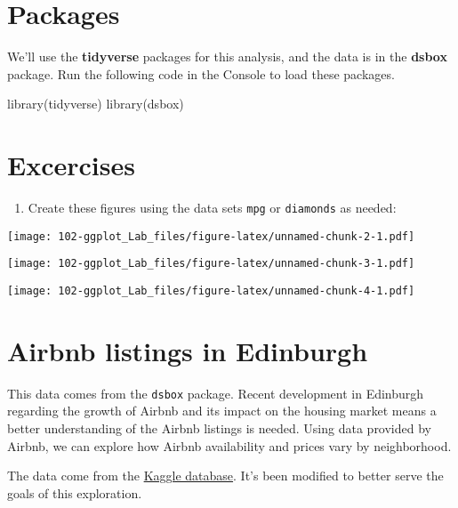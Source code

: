 \documentclass[
]{book}
\newenvironment{Shaded}{\begin{snugshade}}{\end{snugshade}}
\newcommand{\FunctionTok}[1]{\textcolor[rgb]{0.00,0.00,0.00}{#1}}
\newcommand{\NormalTok}[1]{#1}
\providecommand{\tightlist}{%
  \setlength{\itemsep}{0pt}\setlength{\parskip}{0pt}}
\begin{document}
\hypertarget{packages}{%
\section{Packages}\label{packages}}

We'll use the \textbf{tidyverse} packages for this analysis, and the data is in the \textbf{dsbox} package. Run the following code in the Console to load these packages.

\begin{Shaded}
\begin{Highlighting}[]
\FunctionTok{library}\NormalTok{(tidyverse)}
\FunctionTok{library}\NormalTok{(dsbox)}
\end{Highlighting}
\end{Shaded}

\hypertarget{excercises}{%
\section{Excercises}\label{excercises}}

\begin{enumerate}
\def\labelenumi{\arabic{enumi}.}
\tightlist
\item
  Create these figures using the data sets \texttt{mpg} or \texttt{diamonds} as needed:
\end{enumerate}

\texttt{[image: 102-ggplot\_Lab\_files/figure-latex/unnamed-chunk-2-1.pdf]}

\texttt{[image: 102-ggplot\_Lab\_files/figure-latex/unnamed-chunk-3-1.pdf]}

\texttt{[image: 102-ggplot\_Lab\_files/figure-latex/unnamed-chunk-4-1.pdf]}

\hypertarget{airbnb-listings-in-edinburgh}{%
\section{Airbnb listings in Edinburgh}\label{airbnb-listings-in-edinburgh}}

This data comes from the \texttt{dsbox} package. Recent development in Edinburgh regarding the growth of Airbnb and its impact on the housing market means a better understanding of the Airbnb listings is needed. Using data provided by Airbnb, we can explore how Airbnb availability and prices vary by neighborhood.

The data come from the \href{https://www.kaggle.com/thoroc/edinburgh-inside-airbnb/version/2}{Kaggle database}. It's
been modified to better serve the goals of this exploration.
\end{document}
